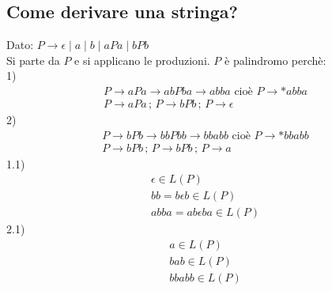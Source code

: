 \documentclass[a4paper,12pt]{article}
\begin{document}
\subsection{Come derivare una stringa?}
Dato: $P \to \epsilon \mid a \mid b \mid aPa \mid bPb$ \\
Si parte da $P$ e si applicano le produzioni. $P$ è palindromo perchè: \\
1)\begin{align*}
  P \to aPa \to abPba \to abba \text{ cioè } P \to *abba \\
  P \to aPa \, ; \, P \to bPb \, ; \, P \to \epsilon
\end{align*} 
2)\begin{align*}
  P \to bPb \to bbPbb \to bbabb \text{ cioè } P \to *bbabb \\
  P \to bPb \, ; \, P \to bPb \, ; \, P \to a
\end{align*} 
1.1) \begin{align*}
  \epsilon \in L(P) \\
  bb = b \epsilon b \in L(P) \\
  abba = ab \epsilon ba \in L(P)
\end{align*}
2.1) \begin{align*}
  a \in L(P) \\
  bab \in L(P) \\
  bbabb \in L(P)
\end{align*}
\end{document}
